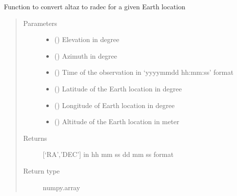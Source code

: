 \documentclass[letterpaper,10pt,english]{sphinxmanual}
\begin{document}
\begin{fulllineitems}
\label{\detokenize{paircars:paircars.basic_func.altaz_to_radec}}
\sphinxAtStartPar
Function to convert altaz to radec for a given Earth location
\begin{quote}\begin{description}
\item[{Parameters}] \leavevmode\begin{itemize}
\item {} 
\sphinxAtStartPar
{} () \textendash{} Elevation in degree

\item {} 
\sphinxAtStartPar
{} () \textendash{} Azimuth in degree

\item {} 
\sphinxAtStartPar
{} () \textendash{} Time of the observation in ‘yyyy\sphinxhyphen{}mm\sphinxhyphen{}dd hh:mm:ss’ format

\item {} 
\sphinxAtStartPar
{} () \textendash{} Latitude of the Earth location in degree

\item {} 
\sphinxAtStartPar
{} () \textendash{} Longitude of Earth location in degree

\item {} 
\sphinxAtStartPar
{} () \textendash{} Altitude of the Earth location in meter

\end{itemize}

\item[{Returns}] \leavevmode
\sphinxAtStartPar
{[}‘RA’,’DEC’{]} in hh mm ss dd mm ss format

\item[{Return type}] \leavevmode
\sphinxAtStartPar
numpy.array

\end{description}\end{quote}

\end{fulllineitems}
\end{document}
